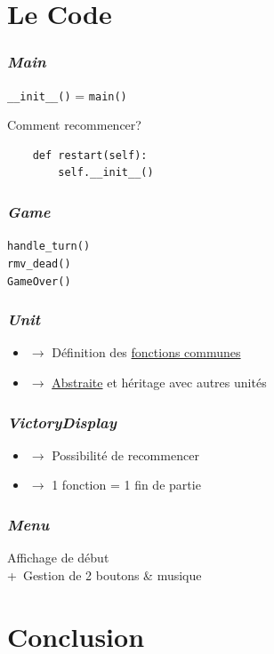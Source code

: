 \documentclass[12pt]{beamer}
\begin{document}
    \section{Le Code} %
        
        \begin{frame}[fragile]
            \frametitle{\emph{Main}}\centering
            \pause
            \texttt{\_\_init\_\_()} = \texttt{main()}
            \pause
            \begin{block}{Comment recommencer?}
                \begin{verbatim}
    def restart(self):
        self.__init__()
                \end{verbatim}
            \end{block}
        \end{frame}
        \begin{frame}
            \frametitle{\emph{Game}}\centering
            \pause
            \texttt{handle\_turn()}\\
            \pause
            \texttt{rmv\_dead()}\\
            \pause
            \texttt{GameOver()}
        \end{frame}
        \begin{frame}
            \frametitle{\emph{Unit}}\centering
            \pause
            \begin{itemize}
                \item{$\rightarrow$} Définition des \underline{fonctions communes}
                \pause
                \item{$\rightarrow$} \underline{Abstraite} et héritage avec autres unités
            \end{itemize}
        \end{frame}
        \begin{frame}
            \frametitle{\emph{VictoryDisplay}}\centering
            \pause
            \begin{itemize}
                \item{$\rightarrow$} Possibilité de recommencer
                \pause
                \item{$\rightarrow$} 1 fonction = 1 fin de partie %
            \end{itemize}
        \end{frame}
        \begin{frame}
            \frametitle{\emph{Menu}}\centering %
            \pause
            Affichage de début\\
            +~Gestion de 2 boutons \&{} musique
        \end{frame}

    \section{Conclusion} %
        
\end{document}
